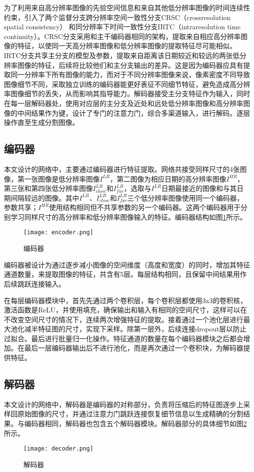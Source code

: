 为了利用来自高分辨率图像的先验空间信息和来自其他低分辨率图像的时间连续性约束，引入了两个监督分支跨分辨率空间一致性分支CRSC（crossresolution spatial consistency） 和同分辨率下时间一致性分支IRTC（intraresolution time continuity）。CRSC分支采用和主干编码器相同的架构，提取来自相应高分辨率图像的特征，以使同一天高分辨率图像和低分辨率图像的提取特征尽可能相似。IRTC分支共享主分支的模型及参数，提取来自距离该日期较近和较远的两张低分辨率图像的特征，后续将比较他们和主分支输出的差异。这是因为编码器应具有提取同一分辨率下所有图像的能力，而对于不同分辨率图像来说，像素密度不同导致图像细节不同，采取独立训练的编码器能更好表征不同细节特征，避免造成高分辨率图像细节的丢失，从而影响其指导能力。解码器接受主分支特征作为输入，同时在每一层解码器处，使用对应层的主分支及近处和远处低分辨率图像和高分辨率图像的中间结果作为键，设计了专门的注意力门，综合多渠道输入，进行解码。逐层操作直至生成分割图像。
\subsection{编码器}
本文设计的网络中，主要通过编码器进行特征提取。网络共接受同样尺寸的4张图像，第一张图像是低分辨率图像\( I^{LR}\)，第二图像为相应日期的高分辨率图像\( I^{HR}\)，第三张和第四张低分辨率图像\( I^{LR}_{close}\)和\( I^{LR}_{far}\)，选取与\( I^{LR}\)日期最接近的图像和与其日期间隔较远的图像。其中\( I^{LR}\)、\(I^{LR}_{close}\)和\( I^{LR}_{far}\)三个低分辨率图像使用同一个编码器，参数共享；\( I^{HR}\)使用结构相同但不共享参数的另一个编码器。这两个编码器用于分别学习同样尺寸的高分辨率和低分辨率图像输入的特征。编码器结构如图\ref{fig:encoder}所示。
\begin{figure}[h]
    \centering
    \texttt{[image: encoder.png]}
    \caption{编码器}
    \label{fig:encoder}
  \end{figure}

编码器被设计为通过逐步减小图像的空间维度（高度和宽度）的同时，增加其特征通道数量，来提取图像的特征，共含有5层。每层结构相同，且保留中间结果用作后续跳跃连接输入。

在每层编码器模块中，首先先通过两个卷积层，每个卷积层都使用3x3的卷积核，激活函数是ReLU，并使用填充，确保输出和输入有相同的空间尺寸，这样可以在不改变空间尺寸的情况下，连续两次增强特征的提取。接着通过一个池化层进行最大池化减半特征图的尺寸，实现下采样。除第一层外，后续连接dropout层以防止过拟合。最后进行批量归一化操作。特征通道的数量在每个编码器模块之后都会增加。在最后一层编码器输出后不进行池化，而是再次通过一个卷积块，为解码器提供特征。

\subsection{解码器}
本文设计的网络中，解码器是编码器的对称部分，负责将压缩后的特征图逐步上采样回原始图像的尺寸，并通过注意力门跳跃连接恢复细节信息以生成精确的分割结果。与编码器相同，解码器也包含五个解码器模块。解码器部分的具体细节如图\ref{fig:decoder}所示。
\begin{figure}[h]
    \centering
    \texttt{[image: decoder.png]}
    \caption{解码器}
    \label{fig:decoder}
  \end{figure}

